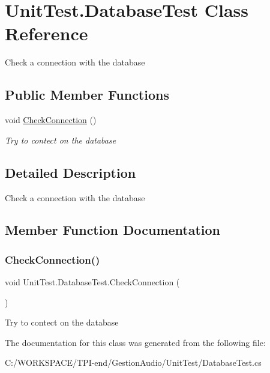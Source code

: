\hypertarget{class_unit_test_1_1_database_test}{}\section{Unit\+Test.\+Database\+Test Class Reference}
\label{class_unit_test_1_1_database_test}


Check a connection with the database  


\subsection*{Public Member Functions}
\begin{DoxyCompactItemize}
\item 
void \hyperlink{class_unit_test_1_1_database_test_a50efedd25f8255592c116e21f429fec7}{Check\+Connection} ()
\begin{DoxyCompactList}\small\item\em Try to contect on the database \end{DoxyCompactList}\end{DoxyCompactItemize}


\subsection{Detailed Description}
Check a connection with the database 



\subsection{Member Function Documentation}
\mbox{\label{class_unit_test_1_1_database_test_a50efedd25f8255592c116e21f429fec7}} 
\subsubsection{\texorpdfstring{Check\+Connection()}{CheckConnection()}}
{\footnotesize\ttfamily void Unit\+Test.\+Database\+Test.\+Check\+Connection (\begin{DoxyParamCaption}{ }\end{DoxyParamCaption})}



Try to contect on the database 



The documentation for this class was generated from the following file\+:\begin{DoxyCompactItemize}
\item 
C\+:/\+W\+O\+R\+K\+S\+P\+A\+C\+E/\+T\+P\+I-\/end/\+Gestion\+Audio/\+Unit\+Test/Database\+Test.\+cs\end{DoxyCompactItemize}
